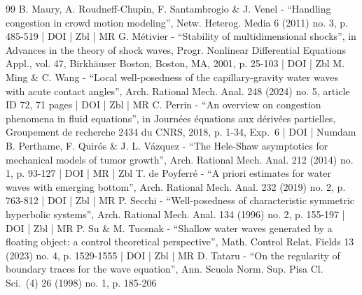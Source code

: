 \begin{thebibliography}{99}
B. Maury, A. Roudneff-Chupin, F. Santambrogio \& J. Venel - “Handling congestion in crowd motion modeling”, Netw. Heterog. Media 6 (2011) no. 3, p. 485-519 | DOI | Zbl | MR
G. Métivier - “Stability of multidimensional shocks”, in Advances in the theory of shock waves, Progr. Nonlinear Differential Equations Appl., vol. 47, Birkhäuser Boston, Boston, MA, 2001, p. 25-103 | DOI | Zbl
M. Ming \& C. Wang - “Local well-posedness of the capillary-gravity water waves with acute contact angles”, Arch. Rational Mech. Anal. 248 (2024) no. 5, article ID 72, 71 pages | DOI | Zbl | MR
C. Perrin - “An overview on congestion phenomena in fluid equations”, in Journées équations aux dérivées partielles, Groupement de recherche 2434 du CNRS, 2018, p. 1-34, Exp. 6 | DOI | Numdam
B. Perthame, F. Quirós \& J. L. Vázquez - “The Hele-Shaw asymptotics for mechanical models of tumor growth”, Arch. Rational Mech. Anal. 212 (2014) no. 1, p. 93-127 | DOI | MR | Zbl
T. de Poyferré - “A priori estimates for water waves with emerging bottom”, Arch. Rational Mech. Anal. 232 (2019) no. 2, p. 763-812 | DOI | Zbl | MR
P. Secchi - “Well-posedness of characteristic symmetric hyperbolic systems”, Arch. Rational Mech. Anal. 134 (1996) no. 2, p. 155-197 | DOI | Zbl | MR
P. Su \& M. Tucsnak - “Shallow water waves generated by a floating object: a control theoretical perspective”, Math. Control Relat. Fields 13 (2023) no. 4, p. 1529-1555 | DOI | Zbl | MR
D. Tataru - “On the regularity of boundary traces for the wave equation”, Ann. Scuola Norm. Sup. Pisa Cl. Sci. (4) 26 (1998) no. 1, p. 185-206
\end{thebibliography}
